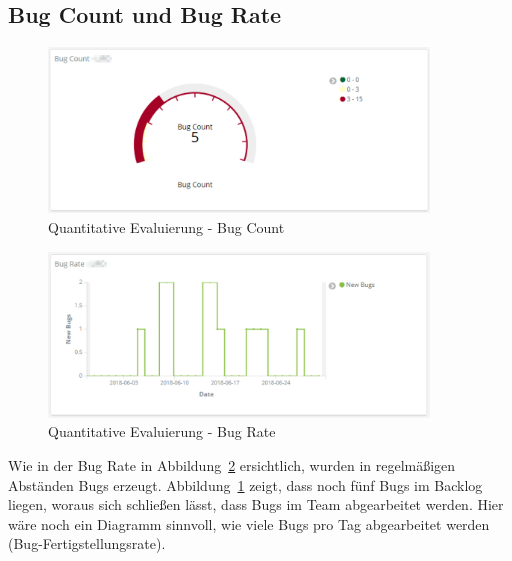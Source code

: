 \clearpage
\subsection*{Bug Count und Bug Rate}

\begin{savenotes}
    \begin{figure}[H]
      \centering
      \includegraphics[width=0.9\textwidth]{img/eval-bug-count.png}
      \caption{Quantitative Evaluierung {-} Bug Count}\label{fig:eval_bug_count}
    \end{figure}
\end{savenotes}

\begin{savenotes}
    \begin{figure}[H]
      \centering
      \includegraphics[width=0.9\textwidth]{img/eval-bug-rate.png}
      \caption{Quantitative Evaluierung {-} Bug Rate}\label{fig:eval_bug_rate}
    \end{figure}
\end{savenotes}

Wie in der Bug Rate in Abbildung~\ref{fig:eval_bug_rate} ersichtlich, wurden in regelmäßigen Abständen Bugs erzeugt.
Abbildung~\ref{fig:eval_bug_count} zeigt, dass noch fünf Bugs im Backlog liegen, woraus sich schließen lässt, dass Bugs im Team abgearbeitet werden.
Hier wäre noch ein Diagramm sinnvoll, wie viele Bugs pro Tag abgearbeitet werden (Bug-Fertigstellungsrate).

\clearpage
